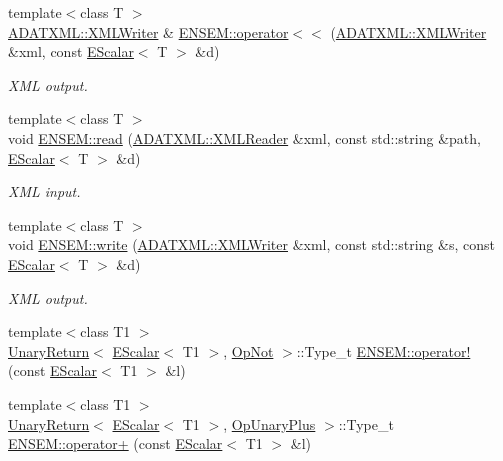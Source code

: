 \begin{DoxyCompactItemize}
{\footnotesize template$<$class T $>$ }\\\mbox{\hyperlink{classADATXML_1_1XMLWriter}{A\+D\+A\+T\+X\+M\+L\+::\+X\+M\+L\+Writer}} \& \mbox{\hyperlink{group__escalar_gae78b4ef06a7e72aa75cae11dd9c48327}{E\+N\+S\+E\+M\+::operator$<$$<$}} (\mbox{\hyperlink{classADATXML_1_1XMLWriter}{A\+D\+A\+T\+X\+M\+L\+::\+X\+M\+L\+Writer}} \&xml, const \mbox{\hyperlink{classENSEM_1_1EScalar}{E\+Scalar}}$<$ T $>$ \&d)
\begin{DoxyCompactList}\small\item\em X\+ML output. \end{DoxyCompactList}\item 
{\footnotesize template$<$class T $>$ }\\void \mbox{\hyperlink{group__escalar_ga5631206e233cf75b5fb2ff13ee8b77ac}{E\+N\+S\+E\+M\+::read}} (\mbox{\hyperlink{classADATXML_1_1XMLReader}{A\+D\+A\+T\+X\+M\+L\+::\+X\+M\+L\+Reader}} \&xml, const std\+::string \&path, \mbox{\hyperlink{classENSEM_1_1EScalar}{E\+Scalar}}$<$ T $>$ \&d)
\begin{DoxyCompactList}\small\item\em X\+ML input. \end{DoxyCompactList}\item 
{\footnotesize template$<$class T $>$ }\\void \mbox{\hyperlink{group__escalar_ga2e7afe18081ed96c569177362d6bb43d}{E\+N\+S\+E\+M\+::write}} (\mbox{\hyperlink{classADATXML_1_1XMLWriter}{A\+D\+A\+T\+X\+M\+L\+::\+X\+M\+L\+Writer}} \&xml, const std\+::string \&s, const \mbox{\hyperlink{classENSEM_1_1EScalar}{E\+Scalar}}$<$ T $>$ \&d)
\begin{DoxyCompactList}\small\item\em X\+ML output. \end{DoxyCompactList}\item 
{\footnotesize template$<$class T1 $>$ }\\\mbox{\hyperlink{structENSEM_1_1UnaryReturn}{Unary\+Return}}$<$ \mbox{\hyperlink{classENSEM_1_1EScalar}{E\+Scalar}}$<$ T1 $>$, \mbox{\hyperlink{structENSEM_1_1OpNot}{Op\+Not}} $>$\+::Type\+\_\+t \mbox{\hyperlink{group__escalar_ga248e30ef2d97325ac4b11c077bc514dd}{E\+N\+S\+E\+M\+::operator!}} (const \mbox{\hyperlink{classENSEM_1_1EScalar}{E\+Scalar}}$<$ T1 $>$ \&l)
\item 
{\footnotesize template$<$class T1 $>$ }\\\mbox{\hyperlink{structENSEM_1_1UnaryReturn}{Unary\+Return}}$<$ \mbox{\hyperlink{classENSEM_1_1EScalar}{E\+Scalar}}$<$ T1 $>$, \mbox{\hyperlink{structENSEM_1_1OpUnaryPlus}{Op\+Unary\+Plus}} $>$\+::Type\+\_\+t \mbox{\hyperlink{group__escalar_ga45a6583b8f7490b2e54b5c88ff07ba94}{E\+N\+S\+E\+M\+::operator+}} (const \mbox{\hyperlink{classENSEM_1_1EScalar}{E\+Scalar}}$<$ T1 $>$ \&l)

\end{DoxyCompactItemize}
